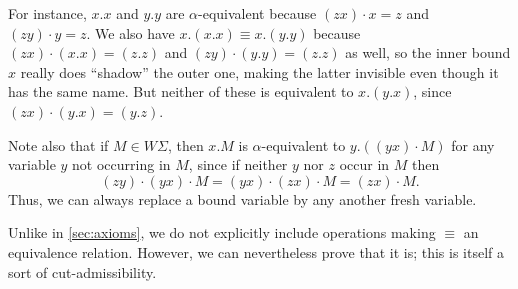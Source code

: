 \documentclass{book}
\def\sig{\Sigma}
\begin{document}
For instance, $x.x$ and $y.y$ are $\alpha$-equivalent because $(zx)\cdot x = z$ and $(zy)\cdot y = z$.
We also have $x.(x.x) \equiv x.(y.y)$ because $(zx)\cdot (x.x) = (z.z)$ and $(zy)\cdot (y.y) = (z.z)$ as well, so the inner bound $x$ really does ``shadow'' the outer one, making the latter invisible even though it has the same name.
But neither of these is equivalent to $x.(y.x)$, since $(zx)\cdot (y.x) = (y.z)$.

Note also that if $M\in W\sig$, then $x.M$ is $\alpha$-equivalent to $y.((yx)\cdot M)$ for any variable $y$ not occurring in $M$, since if neither $y$ nor $z$ occur in $M$ then
\[(zy)\cdot (yx)\cdot M = (yx)\cdot (zx)\cdot M = (zx)\cdot M.\]
Thus, we can always replace a bound variable by any another fresh variable.

Unlike in \cref{sec:axioms}, we do not explicitly include operations making $\equiv$ an equivalence relation.
However, we can nevertheless prove that it is; this is itself a sort of cut-admissibility.
\end{document}
